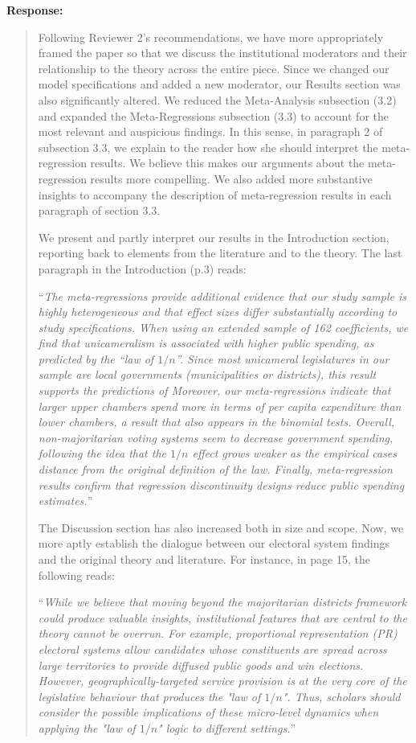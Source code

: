 \documentclass[a4paper,12pt]{article}
\begin{document}
\noindent \textbf{Response:} 
\begin{quote}
    Following Reviewer 2's recommendations, we have more appropriately framed the paper so that we discuss the institutional moderators and their relationship to the theory across the entire piece. Since we changed our model specifications and added a new moderator, our Results section was also significantly altered. We reduced the Meta-Analysis subsection (3.2) and expanded the Meta-Regressions subsection (3.3) to account for the most relevant and auspicious findings. In this sense, in paragraph 2 of subsection 3.3, we explain to the reader how she should interpret the meta-regression results. We believe this makes our arguments about the meta-regression results more compelling. We also added more substantive insights to accompany the description of meta-regression results in each paragraph of section 3.3. 
    
    We present and partly interpret our results in the Introduction section, reporting back to elements from the literature and to the theory. The last paragraph in the Introduction (p.3) reads:
    
    ``\textit{The meta-regressions provide additional evidence that our study sample is highly heterogeneous and that effect sizes differ substantially according to study specifications. When using an extended sample of 162 coefficients, we find that unicameralism is associated with higher public spending, as predicted by the ``law of $1/n$''. Since most unicameral legislatures in our sample are local governments (municipalities or districts), this result supports the predictions of Moreover, our meta-regressions indicate that larger upper chambers spend more in terms of per capita expenditure than lower chambers, a result that also appears in the binomial tests. Overall, non-majoritarian voting systems seem to decrease government spending, following the idea that the $1/n$ effect grows weaker as the empirical cases distance from the original definition of the law. Finally, meta-regression results confirm that regression discontinuity designs reduce public spending estimates.}''
    
    The Discussion section has also increased both in size and scope. Now, we more aptly establish the dialogue between our electoral system findings and the original theory and literature. For instance, in page 15, the following reads:
    
    ``\textit{While we believe that moving beyond the majoritarian districts framework could produce valuable insights, institutional features that are central to the theory cannot be overrun. For example, proportional representation (PR) electoral systems allow candidates whose constituents are spread across large territories to provide diffused public goods and win elections. However, geographically-targeted service provision is at the very core of the legislative behaviour that produces the "law of $1/n$". Thus, scholars should consider the possible implications of these micro-level dynamics when applying the "law of $1/n$" logic to different settings.}''
\end{quote}
\end{document}
